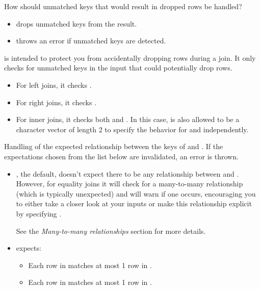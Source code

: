 \documentclass[a4paper]{book}
\begin{document}
\begin{Arguments}
\begin{ldescription}
\begin{itemize}
\end{itemize}


\item[\code{unmatched}] How should unmatched keys that would result in dropped rows
be handled?
\begin{itemize}

\item{}  drops unmatched keys from the result.
\item{}  throws an error if unmatched keys are detected.

\end{itemize}


 is intended to protect you from accidentally dropping rows
during a join. It only checks for unmatched keys in the input that could
potentially drop rows.
\begin{itemize}

\item{} For left joins, it checks .
\item{} For right joins, it checks .
\item{} For inner joins, it checks both  and . In this case,  is
also allowed to be a character vector of length 2 to specify the behavior
for  and  independently.

\end{itemize}


\item[\code{relationship}] Handling of the expected relationship between the keys of
 and . If the expectations chosen from the list below are
invalidated, an error is thrown.
\begin{itemize}

\item{} , the default, doesn't expect there to be any relationship between
 and . However, for equality joins it will check for a many-to-many
relationship (which is typically unexpected) and will warn if one occurs,
encouraging you to either take a closer look at your inputs or make this
relationship explicit by specifying .

See the \emph{Many-to-many relationships} section for more details.
\item{}  expects:
\begin{itemize}

\item{} Each row in  matches at most 1 row in .
\item{} Each row in  matches at most 1 row in .


\end{itemize}
\end{itemize}
\end{ldescription}
\end{Arguments}
\end{document}
